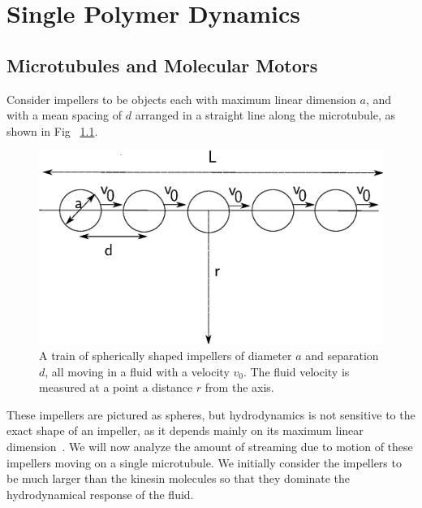 \documentclass[11pt]{ucthesis}
\begin{document}
\chapter{Single Polymer Dynamics}

\section{Microtubules and Molecular Motors}
Consider impellers to be objects each with maximum linear dimension
$a$, and with a mean spacing of $d$ arranged in a straight line along the microtubule, as shown in Fig ~\ref{fig:spheres}. 

\begin{figure}[htp]
\begin{center}
\includegraphics[width=\hsize]{spheres.eps}
\caption{ 
A train of spherically shaped impellers of diameter $a$ and separation $d$, all moving in a fluid with a velocity $v_0$.
The fluid velocity is measured at a point a distance $r$ from the axis.
}
\label{fig:spheres}
\end{center}
\end{figure}

These impellers are pictured as spheres, but hydrodynamics is not sensitive to
the exact shape of an impeller, as it depends mainly on its maximum linear dimension~\cite{BergRandomWalksinBiology}. 
We will
now analyze the amount of streaming due to motion of these impellers
moving on a single microtubule. We initially consider the impellers to be much larger than
the kinesin molecules so that they dominate the hydrodynamical response
of the fluid.
\end{document}
